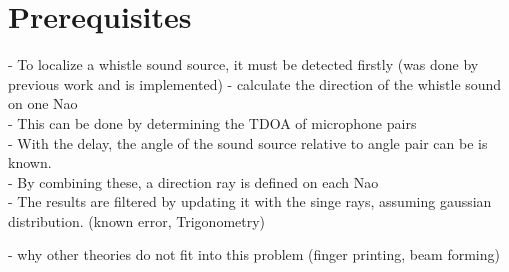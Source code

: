 \chapter{Prerequisites}

- To localize a whistle sound source, it must be detected firstly (was done by previous work
and is implemented)
- calculate the direction of the whistle sound on one Nao\\
- This can be done by determining the \ac{TDOA} of microphone pairs\\
- With the delay, the angle of the sound source relative to angle pair
can be is known.\\
- By combining these, a direction ray is defined on each Nao\\
- The results are filtered by updating it with the singe rays, assuming
gaussian distribution. (known error, Trigonometry)

- why other theories do not fit into this problem
(finger printing, beam forming)







%
%

%
